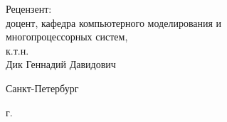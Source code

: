 \begin{titlepage}
\begin{center}
\begin{flushright}
\begin{minipage}[t]{0.65\textwidth}
\vspace{10mm}

{Рецензент:} \\
доцент, кафедра компьютерного моделирования и \\многопроцессорных систем,\\к.т.н.\\Дик Геннадий Давидович
\end{minipage}
\end{flushright}
\vfill 

{Санкт-Петербург}
\par{\the\year{} г.}
\end{center}
\end{titlepage}
\restoregeometry
\addtocounter{page}{1}
